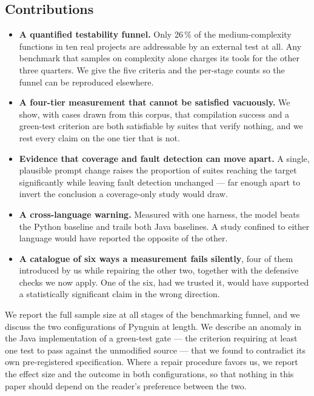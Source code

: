 \subsection*{Contributions}

\begin{itemize}
  \item \textbf{A quantified testability funnel.} Only 26\,\% of the medium-complexity
    functions in ten real projects are addressable by an external test at all. Any benchmark
    that samples on complexity alone charges its tools for the other three quarters. We give
    the five criteria and the per-stage counts so the funnel can be reproduced elsewhere.
  \item \textbf{A four-tier measurement that cannot be satisfied vacuously.} We show, with
    cases drawn from this corpus, that compilation success and a green-test criterion are both
    satisfiable by suites that verify nothing, and we rest every claim on the one tier that is
    not.
  \item \textbf{Evidence that coverage and fault detection can move apart.} A single, plausible
    prompt change raises the proportion of suites reaching the target significantly while
    leaving fault detection unchanged --- far enough apart to invert the conclusion a
    coverage-only study would draw.
  \item \textbf{A cross-language warning.} Measured with one harness, the model beats the
    Python baseline and trails both Java baselines. A study confined to either language would
    have reported the opposite of the other.
  \item \textbf{A catalogue of six ways a measurement fails silently}, four of them introduced
    by us while repairing the other two, together with the defensive checks we now apply. One
    of the six, had we trusted it, would have supported a statistically significant claim in
    the wrong direction.
\end{itemize}

We report the full sample size at all stages of the benchmarking funnel, and we discuss the
two configurations of Pynguin at length. We describe an anomaly in the Java implementation of
a green-test gate --- the criterion requiring at least one test to pass against the unmodified
source --- that we found to contradict its own pre-registered specification. Where a repair
procedure favors us, we report the effect size and the outcome in both configurations, so that
nothing in this paper should depend on the reader's preference between the two.

